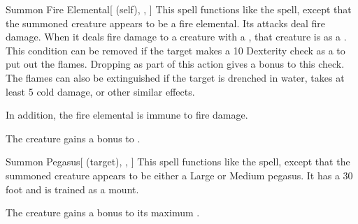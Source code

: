 \lowercase{\hypertarget{spell:Summon Fire Elemental}{}}\label{spell:Summon Fire Elemental}
\begin{attuneability}[Rank 5]{\hypertarget{spell:Summon Fire Elemental}{Summon Fire Elemental}}[ (self), , ]
This spell functions like the  spell, except that the summoned creature appears to be a fire elemental.
Its attacks deal fire damage.
When it deals fire damage to a creature with a , that creature is  as a .
This condition can be removed if the target makes a  10 Dexterity check as a  to put out the flames.
Dropping  as part of this action gives a  bonus to this check.
The flames can also be extinguished if the target is drenched in water, takes at least 5 cold damage, or other similar effects.

In addition, the fire elemental is immune to fire damage.

\rankline
{} The creature gains a  bonus to .

\end{attuneability}
\vspace{0.25em}



\lowercase{\hypertarget{spell:Summon Pegasus}{}}\label{spell:Summon Pegasus}
\begin{attuneability}[Rank 5]{\hypertarget{spell:Summon Pegasus}{Summon Pegasus}}[ (target), , ]
This spell functions like the  spell, except that the summoned creature appears to be either a Large or Medium pegasus.
It has a 30 foot  and is trained as a mount.

\rankline
{} The creature gains a  bonus to its maximum .

\end{attuneability}
\vspace{0.25em}



